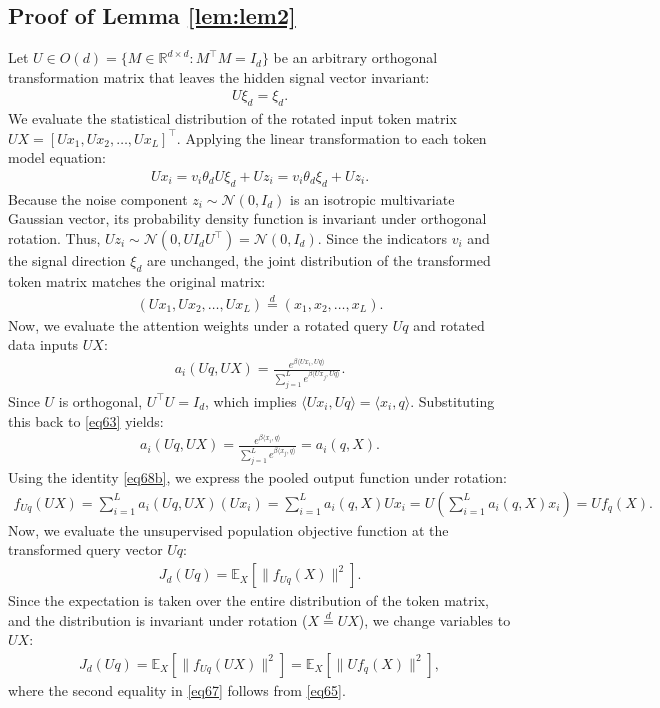\documentclass[11pt,a4paper]{article}
\theoremstyle{definition}
\begin{document}
\subsection{Proof of Lemma \ref{lem:lem2}}
Let $U \in O(d) = \{M \in \mathbb{R}^{d \times d} : M^\top M = I_d\}$ be an arbitrary orthogonal transformation matrix that leaves the hidden signal vector invariant:
\begin{align}
U \xi_d = \xi_d.
\end{align}
We evaluate the statistical distribution of the rotated input token matrix $UX = [Ux_1, Ux_2, \dots, Ux_L]^\top$. Applying the linear transformation to each token model equation:
\begin{align}
Ux_i = v_i \theta_d U \xi_d + Uz_i = v_i \theta_d \xi_d + Uz_i.
\end{align}
Because the noise component $z_i \sim \mathcal{N}(0, I_d)$ is an isotropic multivariate Gaussian vector, its probability density function is invariant under orthogonal rotation. Thus, $Uz_i \sim \mathcal{N}(0, U I_d U^\top) = \mathcal{N}(0, I_d)$. Since the indicators $v_i$ and the signal direction $\xi_d$ are unchanged, the joint distribution of the transformed token matrix matches the original matrix:
\begin{align}
(Ux_1, Ux_2, \dots, Ux_L) \overset{d}{=} (x_1, x_2, \dots, x_L).
\end{align}
Now, we evaluate the attention weights under a rotated query $Uq$ and rotated data inputs $UX$:
\begin{align}
a_i(Uq, UX) = \frac{e^{ \beta \langle Ux_i, Uq \rangle }}{\sum_{j=1}^L e^{\beta \langle Ux_j, Uq \rangle }}. \label{eq63} 
\end{align}
Since $U$ is orthogonal, $U^\top U = I_d$, which implies $\langle Ux_i, Uq \rangle = \langle x_i, q \rangle$. Substituting this back to \eqref{eq63} yields:
\begin{align}
a_i(Uq, UX) = \frac{e^{\beta \langle x_i, q \rangle}}{\sum_{j=1}^L e^{\beta \langle x_j, q \rangle}} = a_i(q, X) \label{eq68b}.
\end{align}
Using the identity \eqref{eq68b}, we express the pooled output function under rotation:
\begin{align}
f_{Uq}(UX) = \sum_{i=1}^L a_i(Uq, UX) (Ux_i) = \sum_{i=1}^L a_i(q, X) U x_i = U \left( \sum_{i=1}^L a_i(q, X) x_i \right) = U f_q(X) \label{eq65}.
\end{align}
Now, we evaluate the unsupervised population objective function at the transformed query vector $Uq$:
\begin{align}
J_d(Uq) = \mathbb{E}_{X}\left[ \|f_{Uq}(X)\|^2 \right].
\end{align}
Since the expectation is taken over the entire distribution of the token matrix, and the distribution is invariant under rotation ($X \overset{d}{=} UX$), we change variables to $UX$:
\begin{align}
J_d(Uq) = \mathbb{E}_{X}\left[ \|f_{Uq}(UX)\|^2 \right] = \mathbb{E}_{X}\left[ \|U f_q(X)\|^2 \right] \label{eq67},
\end{align} where the second equality in \eqref{eq67} follows from \eqref{eq65}. 
\end{document}
